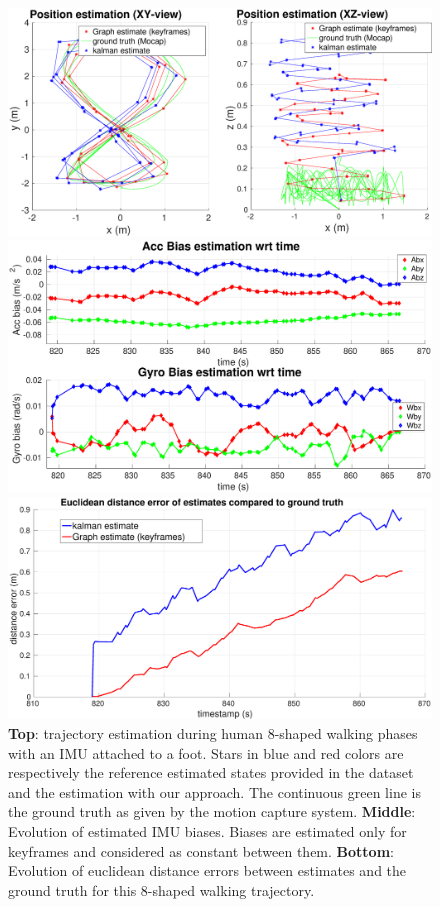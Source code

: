 \begin{figure}[tb]
\centering
\includegraphics[scale=0.175]{figures/experiments/8shape/XY_XZ_viewsRotated2.eps}
\par\vspace{3mm}
\includegraphics[scale=0.166]{figures/experiments/8shape/bias_only2.eps}
\par\vspace{3mm}
\includegraphics[scale=0.164]{figures/experiments/8shape/euclidean_err2.eps}
\caption{ 
{\bf Top}: trajectory estimation during human 8-shaped walking phases with an IMU attached to a foot. Stars in blue and red colors are respectively the reference estimated states provided in the dataset and the estimation with our approach.
The continuous green line is the ground truth as given by the motion capture system.
{\bf Middle}: Evolution of estimated IMU biases. Biases are estimated only for keyframes and considered as constant between them.
{\bf Bottom}: Evolution of euclidean distance errors between estimates and the ground truth for this 8-shaped walking trajectory.
}
\label{fig:8shape_walk}
\end{figure}

